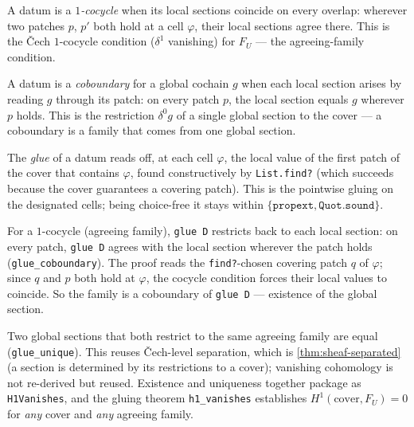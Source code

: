 \begin{definition}\label{def:cocycle}\leanok{}
A datum is a \emph{$1$-cocycle} when its local sections coincide on every overlap: wherever two patches $p$, $p'$ both hold at a cell $\varphi$, their local sections agree there. This is the \v{C}ech $1$-cocycle condition ($\delta^1$ vanishing) for $F_U$ --- the agreeing-family condition.
\end{definition}

\begin{definition}[Coboundary]\label{def:coboundary}\leanok{}
A datum is a \emph{coboundary} for a global cochain $g$ when each local section arises by reading $g$ through its patch: on every patch $p$, the local section equals $g$ wherever $p$ holds. This is the restriction $\delta^0 g$ of a single global section to the cover --- a coboundary is a family that comes from one global section.
\end{definition}

\begin{definition}\label{def:glue}\leanok{}
The \emph{glue} of a datum reads off, at each cell $\varphi$, the local value of the first patch of the cover that contains $\varphi$, found constructively by \texttt{List.find?} (which succeeds because the cover guarantees a covering patch). This is the pointwise gluing on the designated cells; being choice-free it stays within $\{\texttt{propext}, \texttt{Quot.sound}\}$.
\end{definition}

\begin{theorem}\label{thm:h1-vanishes}\leanok{}
For a $1$-cocycle (agreeing family), \texttt{glue D} restricts back to each local section: on every patch, \texttt{glue D} agrees with the local section wherever the patch holds (\texttt{glue\_coboundary}). The proof reads the \texttt{find?}-chosen covering patch $q$ of $\varphi$; since $q$ and $p$ both hold at $\varphi$, the cocycle condition forces their local values to coincide. So the family is a coboundary of \texttt{glue D} --- existence of the global section.
\end{theorem}

\begin{theorem}\label{thm:classifying-invariant-zero}\leanok{}
Two global sections that both restrict to the same agreeing family are equal (\texttt{glue\_unique}). This reuses \v{C}ech-level separation, which is \cref{thm:sheaf-separated} (a section is determined by its restrictions to a cover); vanishing cohomology is not re-derived but reused. Existence and uniqueness together package as \texttt{H1Vanishes}, and the gluing theorem \texttt{h1\_vanishes} establishes $H^1(\text{cover}, F_U) = 0$ for \emph{any} cover and \emph{any} agreeing family.
\end{theorem}

